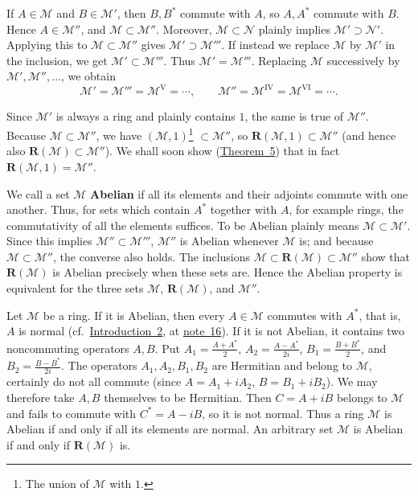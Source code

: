 \documentclass[
  paper=b5,
  twoside=true,
  fontsize=13pt,
  headings=normal,
  bookmarkpackage=false
]{scrartcl}
\theoremstyle{definition}
\newcommand{\NoteRef}[1]{\hyperref[fn:#1]{note~#1}}
\newcommand{\TheoremRef}[1]{\hyperref[thm:#1]{Theorem~#1}}
\newcommand{\GeneratedRing}{\boldsymbol{R}}
\begin{document}
If \(A\in\mathcal M\) and \(B\in\mathcal M'\), then \(B,B^*\)
commute with \(A\), so \(A,A^*\) commute with \(B\). Hence
\(A\in\mathcal M''\), and \(\mathcal M\subset\mathcal M''\).
Moreover, \(\mathcal M\subset\mathcal N\) plainly implies
\(\mathcal M'\supset\mathcal N'\). Applying this to
\(\mathcal M\subset\mathcal M''\) gives
\(\mathcal M'\supset\mathcal M'''\). If instead we replace
\(\mathcal M\) by \(\mathcal M'\) in the inclusion, we get
\(\mathcal M'\subset\mathcal M'''\). Thus
\(\mathcal M'=\mathcal M'''\). Replacing \(\mathcal M\) successively
by \(\mathcal M',\mathcal M'',\ldots\), we obtain
\[
  \mathcal M'=\mathcal M'''=\mathcal M^{\mathrm V}=\cdots,
  \qquad
  \mathcal M''=\mathcal M^{\mathrm{IV}}
  =\mathcal M^{\mathrm{VI}}=\cdots.
\]

Since \(\mathcal M'\) is always a ring and plainly contains \(1\), the
same is true of \(\mathcal M''\). Because \(\mathcal M\subset\mathcal M''\),
we have \((\mathcal M,1)\)\footnote{\label{fn:41}The union of
\(\mathcal M\) with \(1\).} \(\subset\mathcal M''\), so
\(\GeneratedRing (\mathcal M,1)\subset\mathcal M''\) (and hence also
\(\GeneratedRing (\mathcal M)\subset\mathcal M''\)). We shall soon show (\TheoremRef{5})
that in fact \(\GeneratedRing (\mathcal M,1)=\mathcal M''\).

We call a set \(\mathcal M\) \textbf{Abelian} if all its elements and their
adjoints commute with one another.  Thus, for sets which contain \(A^*\)
together with \(A\), for example rings, the commutativity of all the
elements suffices.  To be Abelian plainly means
\(\mathcal M\subset\mathcal M'\).  Since this implies
\(\mathcal M''\subset\mathcal M'''\), \(\mathcal M''\) is Abelian
whenever \(\mathcal M\) is; and because
\(\mathcal M\subset\mathcal M''\), the converse also holds. The inclusions
\(\mathcal M\subset \GeneratedRing (\mathcal M)\subset\mathcal M''\) show that
\(\GeneratedRing (\mathcal M)\) is Abelian precisely when these sets are. Hence the
Abelian property is equivalent for the three sets
\(\mathcal M\), \(\GeneratedRing (\mathcal M)\), and \(\mathcal M''\).

Let \(\mathcal M\) be a ring. If it is Abelian, then every
\(A\in\mathcal M\) commutes with \(A^*\), that is, \(A\) is normal
(cf.\ \hyperref[intro:2]{Introduction~2}, at \NoteRef{16}). If it is not
Abelian, it contains two noncommuting operators \(A,B\). Put
\(A_1=\frac{A+A^*}{2}\), \(A_2=\frac{A-A^*}{2i}\),
\(B_1=\frac{B+B^*}{2}\), and \(B_2=\frac{B-B^*}{2i}\).
The operators \(A_1,A_2,B_1,B_2\) are Hermitian and belong to \(\mathcal M\),
certainly do not all commute (since \(A=A_1+iA_2\),
\(B=B_1+iB_2\)).  We may therefore take \(A,B\) themselves to be
Hermitian.  Then \(C=A+iB\) belongs to \(\mathcal M\) and fails to
commute with \(C^*=A-iB\), so it is not normal. Thus a ring
\(\mathcal M\) is Abelian if and only if all its elements are normal.
An arbitrary set \(\mathcal M\) is Abelian if and only if
\(\GeneratedRing (\mathcal M)\) is.
\end{document}
